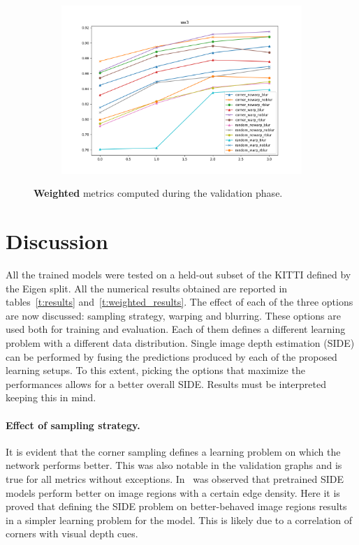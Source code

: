 \begin{figure}
\begin{adjustwidth}{-0.2\textwidth}{-0.2\textwidth}
        \begin{subfigure}{0.6\textwidth}
            \includegraphics[width=\textwidth]{figs/wa3}
        \end{subfigure}
    \end{adjustwidth}
    \caption{
        \textbf{Weighted} metrics computed during the validation phase.
        \label{fig:validation}
    }
\end{figure}

\section{Discussion}
\label{sec:discussion}

All the trained models were tested on a held-out subset of the KITTI defined by the Eigen split.
All the numerical results obtained are reported in tables~\ref{t:results} and~\ref{t:weighted_results}.
The effect of each of the three options are now discussed: sampling strategy, warping and blurring.
These options are used both for training and evaluation.
Each of them defines a different learning problem with a different data distribution.
Single image depth estimation (SIDE) can be performed by fusing the predictions produced by each of the proposed learning setups.
To this extent, picking the options that maximize the performances allows for a better overall SIDE.
Results must be interpreted keeping this in mind.

\paragraph{Effect of sampling strategy.}
It is evident that the corner sampling defines a learning problem on which the network performs better.
This was also notable in the validation graphs and is true for all metrics without exceptions.
In~\cite{BoostingDepth} was observed that pretrained SIDE models perform better on image regions with a certain edge density.
Here it is proved that defining the SIDE problem on better-behaved image regions results in a simpler learning problem for the model.
This is likely due to a correlation of corners with visual depth cues.

